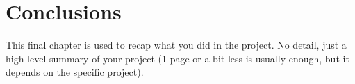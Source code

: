 \chapter{Conclusions}
This final chapter is used to recap what you did in the project. No detail, just a high-level summary of your project (1 page or a bit less is usually enough, but it depends on the specific project).